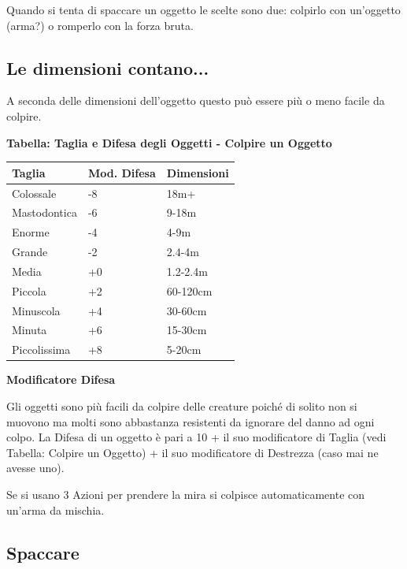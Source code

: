 \begin{multicols}{2}

\label{sfondare-ed-entrare}

Quando si tenta di spaccare un oggetto le scelte sono due: colpirlo con un'oggetto (arma?) o romperlo con la forza bruta.

\smallskip

\subsection{Le dimensioni contano...}

A seconda delle dimensioni dell'oggetto questo può essere più o meno facile da colpire.

\medskip

\textbf{Tabella: Taglia e Difesa degli Oggetti - Colpire un Oggetto}

\medskip

\noindent\begin{tabularx}{\linewidth}{Xll}
	\toprule
\textbf{Taglia} & \textbf{Mod. Difesa} & \textbf{Dimensioni}\\
\toprule
Colossale & -8 &18m+\\
Mastodontica & -6 &9-18m\\
Enorme & -4 &4-9m\\
Grande & -2 &2.4-4m\\
Media & +0 &1.2-2.4m\\
Piccola & +2 &60-120cm\\
Minuscola & +4 &30-60cm\\
Minuta & +6 &15-30cm\\
Piccolissima & +8 &5-20cm
\end{tabularx}

\medskip

\textbf{Modificatore Difesa}

Gli oggetti sono più facili da colpire delle creature poiché di solito non si muovono ma molti sono abbastanza resistenti da ignorare del danno ad ogni colpo. La Difesa di un oggetto è pari a 10 + il suo modificatore di Taglia (vedi Tabella: Colpire un Oggetto) + il suo modificatore di Destrezza (caso mai ne avesse uno).

Se si usano 3 Azioni per prendere la mira si colpisce automaticamente con un'arma da mischia.

\subsection{Spaccare}


\end{multicols}
